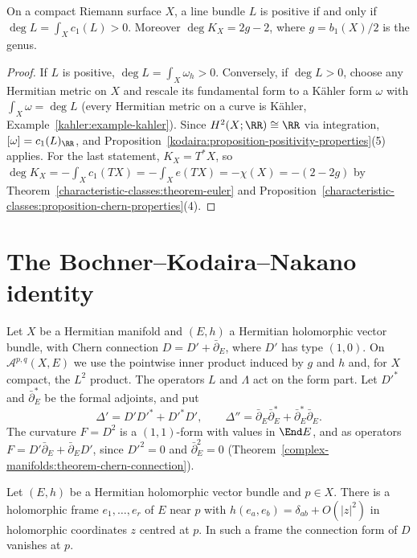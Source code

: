 \begin{proposition}\label{kodaira:proposition-positive-curves}
On a compact Riemann surface $X$, a line bundle $L$ is positive if and only if $\deg L = \int_Xc_1(L) > 0$. Moreover
$\deg K_X = 2g - 2$, where $g = b_1(X)/2$ is the genus.
\end{proposition}

\begin{proof}
If $L$ is positive, $\deg L = \int_X\omega_h > 0$. Conversely, if $\deg L > 0$, choose any Hermitian metric on $X$ and rescale its
fundamental form to a K\"ahler form $\omega$ with $\int_X\omega = \deg L$ (every Hermitian metric on a curve is K\"ahler,
Example~\ref{kahler:example-kahler}). Since $H^2(X; \RR) \cong \RR$ via integration, $[\omega] = c_1(L)_\RR$, and
Proposition~\ref{kodaira:proposition-positivity-properties}(5) applies. For the last statement, $K_X = T^*X$, so
$\deg K_X = -\int_Xc_1(TX) = -\int_Xe(TX) = -\chi(X) = -(2 - 2g)$ by Theorem~\ref{characteristic-classes:theorem-euler} and
Proposition~\ref{characteristic-classes:proposition-chern-properties}(4).
\end{proof}

\section{The Bochner--Kodaira--Nakano identity}\label{kodaira:section-nakano}

\begin{notation}\label{kodaira:notation-bundle-valued}
Let $X$ be a Hermitian manifold and $(E, h)$ a Hermitian holomorphic vector bundle, with Chern connection $D = D' + \bar\partial_E$, where
$D'$ has type $(1,0)$. On $\mathcal{A}^{p,q}(X, E)$ we use the pointwise inner product induced by $g$ and $h$ and, for $X$ compact, the $L^2$
product. The operators $L$ and $\Lambda$ act on the form part. Let $D'^*$ and $\bar\partial_E^*$ be the formal adjoints, and put
\[
\Delta' = D'D'^* + D'^*D', \qquad \Delta'' = \bar\partial_E\bar\partial_E^* + \bar\partial_E^*\bar\partial_E .
\]
The curvature $F = D^2$ is a $(1,1)$-form with values in $\End E$, and as operators $F = D'\bar\partial_E + \bar\partial_ED'$, since
$D'^2 = 0$ and $\bar\partial_E^2 = 0$ (Theorem~\ref{complex-manifolds:theorem-chern-connection}).
\end{notation}

\begin{lemma}\label{kodaira:lemma-normal-frame}
Let $(E, h)$ be a Hermitian holomorphic vector bundle and $p \in X$. There is a holomorphic frame $e_1, \ldots, e_r$ of $E$ near $p$ with
$h(e_a, e_b) = \delta_{ab} + O(|z|^2)$ in holomorphic coordinates $z$ centred at $p$. In such a frame the connection form of $D$ vanishes at $p$.
\end{lemma}


